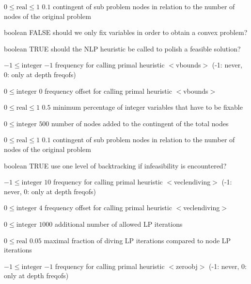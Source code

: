 %
{$0\leq\textrm{real}\leq1$}%
{$0.1$}%
{contingent of sub problem nodes in relation to the number of nodes of the original problem}%
{}

%
{boolean}%
{FALSE}%
{should we only fix variables in order to obtain a convex problem?}%
{}

%
{boolean}%
{TRUE}%
{should the NLP heuristic be called to polish a feasible solution?}%
{}

%
{$-1\leq\textrm{integer}$}%
{$-1$}%
{frequency for calling primal heuristic $<$vbounds$>$ (-1: never, 0: only at depth freqofs)}%
{}

%
{$0\leq\textrm{integer}$}%
{$0$}%
{frequency offset for calling primal heuristic $<$vbounds$>$}%
{}

%
{$0\leq\textrm{real}\leq1$}%
{$0.5$}%
{minimum percentage of integer variables that have to be fixable}%
{}

%
{$0\leq\textrm{integer}$}%
{$500$}%
{number of nodes added to the contingent of the total nodes}%
{}

%
{$0\leq\textrm{real}\leq1$}%
{$0.1$}%
{contingent of sub problem nodes in relation to the number of nodes of the original problem}%
{}

%
{boolean}%
{TRUE}%
{use one level of backtracking if infeasibility is encountered?}%
{}

%
{$-1\leq\textrm{integer}$}%
{$10$}%
{frequency for calling primal heuristic $<$veclendiving$>$ (-1: never, 0: only at depth freqofs)}%
{}

%
{$0\leq\textrm{integer}$}%
{$4$}%
{frequency offset for calling primal heuristic $<$veclendiving$>$}%
{}

%
{$0\leq\textrm{integer}$}%
{$1000$}%
{additional number of allowed LP iterations}%
{}

%
{$0\leq\textrm{real}$}%
{$0.05$}%
{maximal fraction of diving LP iterations compared to node LP iterations}%
{}

%
{$-1\leq\textrm{integer}$}%
{$-1$}%
{frequency for calling primal heuristic $<$zeroobj$>$ (-1: never, 0: only at depth freqofs)}%
{}

